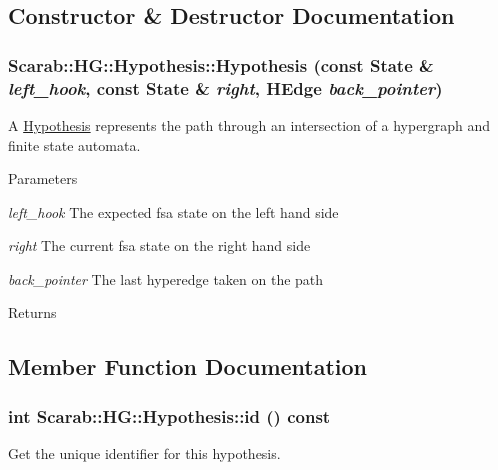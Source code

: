 \subsection{Constructor \& Destructor Documentation}
\hypertarget{struct_scarab_1_1_h_g_1_1_hypothesis_aca7357ce485cb960fadb2cc62f1a888a}{
\subsubsection[{Hypothesis}]{\setlength{\rightskip}{0pt plus 5cm}Scarab::HG::Hypothesis::Hypothesis (const {\bf State} \& {\em left\_\-hook}, \/  const {\bf State} \& {\em right}, \/  {\bf HEdge} {\em back\_\-pointer})}}
\label{struct_scarab_1_1_h_g_1_1_hypothesis_aca7357ce485cb960fadb2cc62f1a888a}
A \hyperlink{struct_scarab_1_1_h_g_1_1_hypothesis}{Hypothesis} represents the path through an intersection of a hypergraph and finite state automata.


\begin{DoxyParams}{Parameters}
\item[{\em left\_\-hook}]The expected fsa state on the left hand side \item[{\em right}]The current fsa state on the right hand side \item[{\em back\_\-pointer}]The last hyperedge taken on the path\end{DoxyParams}
\begin{DoxyReturn}{Returns}

\end{DoxyReturn}


\subsection{Member Function Documentation}
\hypertarget{struct_scarab_1_1_h_g_1_1_hypothesis_a5a69f417c889d4d96ad5a78aa1dd2f7d}{
\subsubsection[{id}]{\setlength{\rightskip}{0pt plus 5cm}int Scarab::HG::Hypothesis::id () const}}
\label{struct_scarab_1_1_h_g_1_1_hypothesis_a5a69f417c889d4d96ad5a78aa1dd2f7d}
Get the unique identifier for this hypothesis.

